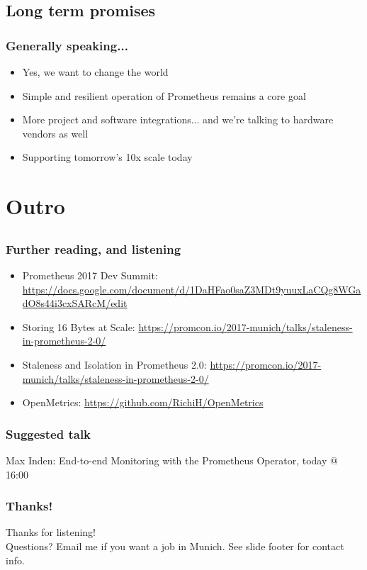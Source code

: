 \documentclass[t]{beamer}
\begin{document}
\subsection{Long term promises}

\begin{frame}
	\frametitle{Generally speaking...}
	\begin{itemize}
		\item Yes, we want to change the world
		\item Simple and resilient operation of Prometheus remains a core goal
		\item More project and software integrations... and we're talking to hardware vendors as well
		\item Supporting tomorrow's 10x scale today
	\end{itemize}
\end{frame}



\section{Outro}


\subsection{}


\begin{frame}
	\frametitle{Further reading, and listening}
	\begin{itemize}
		\item Prometheus 2017 Dev Summit: \url{https://docs.google.com/document/d/1DaHFao0saZ3MDt9yuuxLaCQg8WGadO8s44i3cxSARcM/edit}
		\item Storing 16 Bytes at Scale: \url{https://promcon.io/2017-munich/talks/staleness-in-prometheus-2-0/}
		\item Staleness and Isolation in Prometheus 2.0: \url{https://promcon.io/2017-munich/talks/staleness-in-prometheus-2-0/}
		\item OpenMetrics: \url{https://github.com/RichiH/OpenMetrics}
	\end{itemize}
\end{frame}

\begin{frame}
	\frametitle{Suggested talk}
	\vfill
	Max Inden: End-to-end Monitoring with the Prometheus Operator, today @ 16:00
	\vfill
\end{frame}

\begin{frame}
	\frametitle{Thanks!}
		\begin{center}
			\vfill
			Thanks for listening!\\
			\vfill
			Questions?
			\vfill
			Email me if you want a job in Munich.
			\vfill
			See slide footer for contact info.
			\vfill
		\end{center}
\end{frame}
\end{document}
